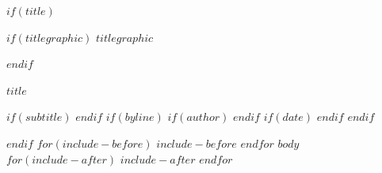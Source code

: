\documentclass[$if(fontsize)$$fontsize$$else$10pt$endif$,$if(papersize)$$papersize$paper$else$a4paper$endif$$if(twocolumn)$,twocolumn$endif$]{article}
\begin{document}
$if(title)$
\begin{center}
$if(titlegraphic)$
$titlegraphic$\par
\vspace{4pt}
$endif$
{\LARGE\bfseries $title$\par}
$if(subtitle)$
\vspace{3pt}{\large $subtitle$\par}
$endif$
$if(byline)$
$if(author)$
\vspace{6pt}{\large $for(author)$$author$$sep$, $endfor$\par}
$endif$
$if(date)$
\vspace{3pt}{\small $date$\par}
$endif$
$endif$
\end{center}
\vspace{6pt}
$endif$
$for(include-before)$
$include-before$
$endfor$
$body$
$for(include-after)$
$include-after$
$endfor$
\end{document}
